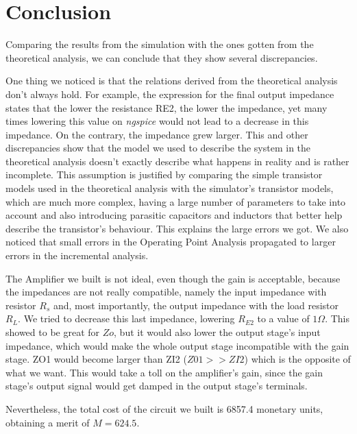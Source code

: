 \section{Conclusion}
\label{sec:conclusion}

Comparing the results from the simulation with the ones gotten from the theoretical analysis, we can conclude that they show several discrepancies.

One thing we noticed is that the relations derived from the theoretical analysis don't always hold. For example, the expression for the final output impedance states that the lower the resistance RE2, the lower the impedance, yet many times lowering this value on \textit{ngspice} would not lead
to a decrease in this impedance. On the contrary, the impedance grew larger. This and other discrepancies show that the model we used to describe the system in the theoretical analysis doesn't exactly describe what happens in reality and is rather incomplete. This assumption is justified by comparing
the simple transistor models used in the theoretical analysis with the simulator's transistor models, which are much more complex, having a large number of parameters to take into account and also introducing parasitic capacitors and inductors that better help describe the transistor's behaviour.
This explains the large errors we got. We also noticed that small errors in the Operating Point Analysis propagated to larger errors in the incremental analysis.
\par
The Amplifier we built is not ideal, even though the gain is acceptable, because the impedances are not really compatible, namely the input impedance with resistor $R_s$ and, most importantly, the output impedance with the load resistor $R_L$. We tried to decrease this last impedance, lowering
$R_{E2}$ to a value of $1\Omega$. This showed to be great for $Zo$, but it would also lower the output stage's input impedance, which would make the whole output stage incompatible with the gain stage. ZO1 would become larger than ZI2 ($Z01>>ZI2$) which is the opposite of what we want. This would take a toll on the
amplifier's gain, since the gain stage's output signal would get damped in the output stage's terminals. \par

Nevertheless, the total cost of the circuit we built is 6857.4 monetary units, obtaining a merit of $M=624.5$.
